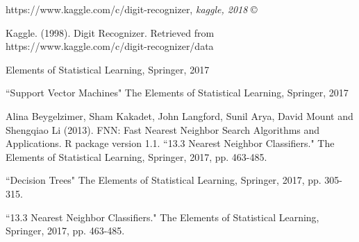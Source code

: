 \documentclass[11pt, oneside]{article}   	%
\begin{document}

\begin{thebibliography}{9}

https://www.kaggle.com/c/digit-recognizer, \textit{kaggle, 2018} \copyright
 
Kaggle. (1998). Digit Recognizer. Retrieved from https://www.kaggle.com/c/digit-recognizer/data 

Elements of Statistical Learning, Springer, 2017

``Support Vector Machines" The Elements of Statistical Learning, Springer, 2017

Alina Beygelzimer, Sham Kakadet, John Langford, Sunil Arya, David Mount and Shengqiao
  Li (2013). FNN: Fast Nearest Neighbor Search Algorithms and Applications. R package
  version 1.1.
``13.3 Nearest Neighbor Classifiers." The Elements of Statistical Learning, Springer, 2017, pp. 463-485. 

``Decision Trees" The Elements of Statistical Learning, Springer, 2017, pp. 305-315.

``13.3 Nearest Neighbor Classifiers." The Elements of Statistical Learning, Springer, 2017, pp. 463-485.
 
\end{thebibliography}
\end{document}
